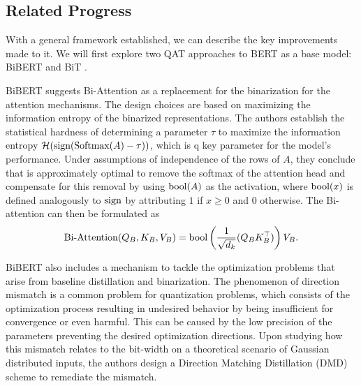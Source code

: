 \subsection{Related Progress}

With a general framework established, we can describe the key improvements made to it. We will first explore two QAT approaches to BERT as a base model:  BiBERT \cite{Qin2022bibert} and BiT \cite{liu2022bit}.

BiBERT suggests Bi-Attention as a replacement for the binarization for the attention mechanisms. The design choices are based on maximizing the information entropy of the binarized representations. The authors establish the statistical hardness of determining a parameter $\tau$ to maximize the information entropy $\mathcal{H}(\text{sign}(\text{Softmax}(A) - \tau))$, which is q key parameter for the model's performance. Under assumptions of independence of the rows of $A$, they conclude that is approximately optimal to remove the softmax of the attention head and compensate for this removal by using $\text{bool}(A)$ as the activation, where $\text{bool}(x)$ is defined analogously to $\text{sign}$ by attributing $1$ if $x \geq 0$ and $0$ otherwise. The Bi-attention can then be formulated as
\begin{equation}
    \text{Bi-Attention}(Q_B, K_B, V_B) = \text{bool} \left( \frac{1}{\sqrt{d_k}} (Q_B K_B^\top )\right) V_B.
\end{equation}

BiBERT also includes a mechanism to tackle the optimization problems that arise from baseline distillation and binarization. The phenomenon of direction mismatch is a common problem for quantization problems, which consists of the optimization process resulting in undesired behavior by being insufficient for convergence or even harmful. This can be caused by the low precision of the parameters preventing the desired optimization directions. Upon studying how this mismatch relates to the bit-width on a theoretical scenario of Gaussian distributed inputs, the authors design a Direction Matching Distillation (DMD) scheme to remediate the mismatch.

